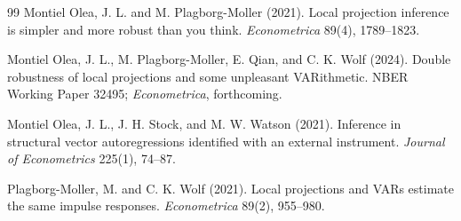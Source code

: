 \documentclass[11pt]{article}
\theoremstyle{definition}
\theoremstyle{plain}
\theoremstyle{remark}
\begin{document}
\begin{thebibliography}{99}
Montiel Olea, J. L. and M. Plagborg-Moller (2021).
Local projection inference is simpler and more robust than you think.
\emph{Econometrica} 89(4), 1789--1823.

Montiel Olea, J. L., M. Plagborg-Moller, E. Qian, and C. K. Wolf (2024).
Double robustness of local projections and some unpleasant VARithmetic.
NBER Working Paper 32495; \emph{Econometrica}, forthcoming.

Montiel Olea, J. L., J. H. Stock, and M. W. Watson (2021).
Inference in structural vector autoregressions identified with an external instrument.
\emph{Journal of Econometrics} 225(1), 74--87.

Plagborg-Moller, M. and C. K. Wolf (2021).
Local projections and VARs estimate the same impulse responses.
\emph{Econometrica} 89(2), 955--980.
\end{thebibliography}
\end{document}
